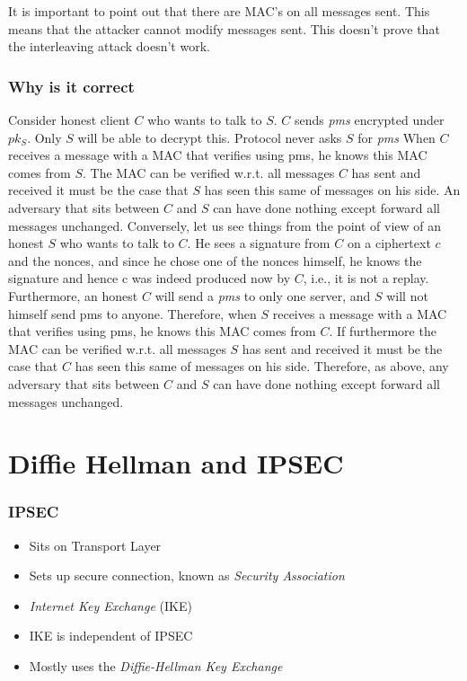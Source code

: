 \documentclass[14pt]{beamer}
\begin{document}
            \begin{frame}
                It is important to point out that there are MAC's on all messages sent. This means that the attacker cannot modify messages sent. This doesn't prove that the interleaving attack doesn't work. 
            \end{frame}

            \begin{frame}
                \frametitle{Why is it correct}
                    Consider honest client $C$ who wants to talk to $S$. $C$ sends \textit{pms} encrypted under $pk_S$.
                    Only $S$ will be able to decrypt this. 
                    Protocol never asks $S$ for \textit{pms} 
                    When $C$ receives a message with a MAC that verifies using pms, he knows this MAC comes from $S$. 
                    The MAC can be verified w.r.t. all messages $C$ has sent and received it must be the case that $S$ has seen this same of messages on his side. 
                    An adversary that sits between $C$ and $S$ can have done nothing except forward all messages unchanged. 
                    Conversely, let us see things from the point of view of an honest $S$ who wants to talk to $C$. He sees a signature from $C$ on a ciphertext $c$ and the nonces, and since he chose one of the nonces himself, he knows the signature and hence c was indeed produced now by $C$, i.e., it is not a replay. Furthermore, an honest $C$ will send a \textit{pms} to only one server, and $S$ will not himself send pms to anyone. Therefore, when $S$ receives a message with a MAC that verifies using pms, he knows this MAC comes from $C$. If furthermore the MAC can be verified w.r.t. all messages $S$ has sent and received it must be the case that $C$ has seen this same of messages on his side. Therefore, as above, any adversary that sits between $C$ and $S$ can have done nothing except forward all messages unchanged.
            \end{frame}

\section{Diffie Hellman and IPSEC}
    \begin{frame}
        \frametitle{IPSEC}
            \begin{itemize}
                \item Sits on Transport Layer
                \item Sets up secure connection, known as \textit{Security Association}
                \item \textit{Internet Key Exchange} (IKE)
                \item IKE is independent of IPSEC
                \item Mostly uses the \textit{Diffie-Hellman Key Exchange}
            \end{itemize}
    \end{frame}
\end{document}

